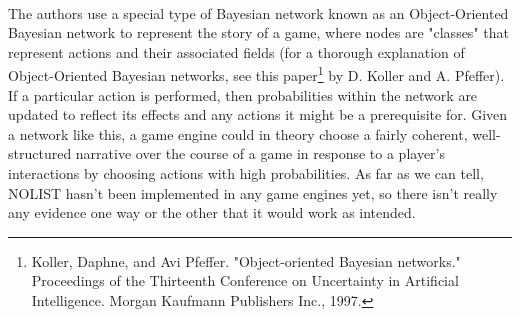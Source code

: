 \documentclass[11pt]{article}
\begin{document}
\begin{itemize}
\\ The authors use a special type of Bayesian network known as an Object-Oriented Bayesian network to represent the story of a game, where nodes are "classes" that represent actions and their associated fields (for a thorough explanation of Object-Oriented Bayesian networks, see this paper\footnote{Koller, Daphne, and Avi Pfeffer. "Object-oriented Bayesian networks." Proceedings of the Thirteenth Conference on Uncertainty in Artificial Intelligence. Morgan Kaufmann Publishers Inc., 1997.} by D. Koller and A. Pfeffer). If a particular action is performed, then probabilities within the network are updated to reflect its effects and any actions it might be a prerequisite for. Given a network like this, a game engine could in theory choose a fairly coherent, well-structured narrative over the course of a game in response to a player's interactions by choosing actions with high probabilities. As far as we can tell, NOLIST hasn't been implemented in any game engines yet, so there isn't really any evidence one way or the other that it would work as intended. 
\end{itemize}
\end{document}
